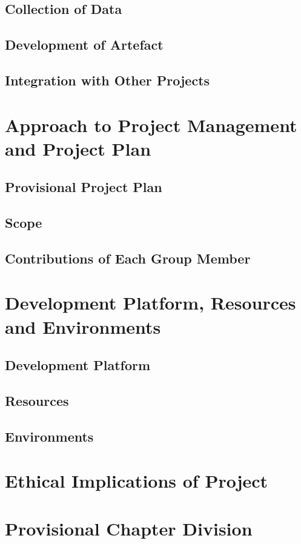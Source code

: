 \subsection{Collection of Data}
\subsection{Development of Artefact}
\subsection{Integration with Other Projects}

\section{Approach to Project Management and Project Plan}
\subsection{Provisional Project Plan}
\subsection{Scope}
\subsection{Contributions of Each Group Member}

\section{Development Platform, Resources and Environments}
\subsection{Development Platform}
\subsection{Resources}
\subsection{Environments}

\section{Ethical Implications of Project}

\section{Provisional Chapter Division}

